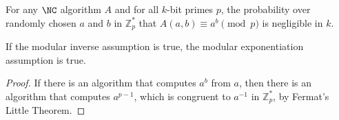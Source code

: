 \documentclass{article}
\newcommand{\Zp}{\mathbb{Z}^*_p}
\begin{document}
\begin{assumption}
  For any $\NC$ algorithm $A$ and for all $k$-bit primes $p$, the probability over randomly chosen $a$ and $b$ in $\Zp$ that $A(a, b) \equiv a^b \pmod{p}$ is negligible in $k$.
\end{assumption}

\begin{proposition}
  If the modular inverse assumption is true, the modular exponentiation assumption is true.
\end{proposition}
\begin{proof}
  If there is an algorithm that computes $a^b$ from $a$, then there is an algorithm that computes $a^{p - 1}$, which is congruent to $a^{-1}$ in $\Zp$, by Fermat's Little Theorem.
\end{proof}



\end{document}
